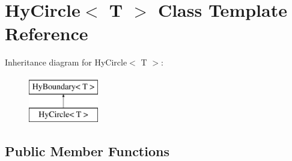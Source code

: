\hypertarget{classHyCircle}{
\section{HyCircle$<$ T $>$ Class Template Reference}
\label{classHyCircle}
}
Inheritance diagram for HyCircle$<$ T $>$:\begin{figure}[H]
\begin{center}
\leavevmode
\includegraphics[height=2cm]{classHyCircle}
\end{center}
\end{figure}
\subsection*{Public Member Functions}
